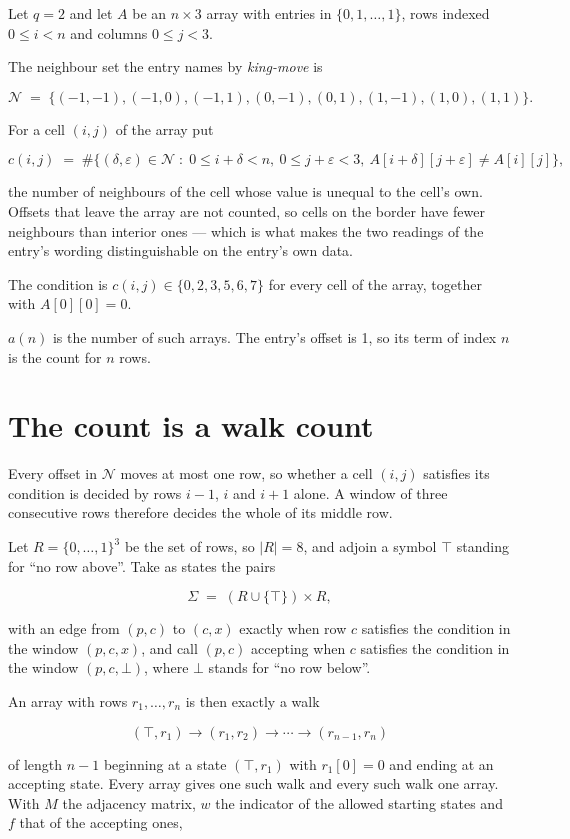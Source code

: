 \documentclass[11pt]{article}
\theoremstyle{definition}
\begin{document}
Let $q = 2$ and let $A$ be an $n \times 3$ array with entries in $\{0,1,\dots,1\}$, rows indexed $0 \le i < n$ and columns $0 \le j < 3$.

The neighbour set the entry names by {\itshape king-move} is

\[\mathcal{N} \;=\; \{(-1,-1), (-1,0), (-1,1), (0,-1), (0,1), (1,-1), (1,0), (1,1)\}.\]

For a cell $(i,j)$ of the array put

\[c(i,j) \;=\; \#\bigl\{(\delta,\varepsilon)\in\mathcal{N} \;:\; 0\le i+\delta<n,\ 0\le j+\varepsilon<3,\ A[i+\delta][j+\varepsilon] \neq A[i][j]\bigr\},\]

the number of neighbours of the cell whose value is unequal to the cell's own. Offsets that leave the array are not counted, so cells on the border have fewer neighbours than interior ones --- which is what makes the two readings of the entry's wording distinguishable on the entry's own data.

The condition is $c(i,j) \in \{0, 2, 3, 5, 6, 7\}$ for every cell of the array, together with $A[0][0]=0$.

$a(n)$ is the number of such arrays. The entry's offset is 1, so its term of index $n$ is the count for $n$ rows.

\section{The count is a walk count}

Every offset in $\mathcal{N}$ moves at most one row, so whether a cell $(i,j)$ satisfies its condition is decided by rows $i-1$, $i$ and $i+1$ alone. A window of three consecutive rows therefore decides the whole of its middle row.

Let $R = \{0,\dots,1\}^{3}$ be the set of rows, so $|R| = 8$, and adjoin a symbol $\top$ standing for ``no row above''. Take as states the pairs

\[\Sigma \;=\; (R \cup \{\top\}) \times R,\]

with an edge from $(p,c)$ to $(c,x)$ exactly when row $c$ satisfies the condition in the window $(p,c,x)$, and call $(p,c)$ accepting when $c$ satisfies the condition in the window $(p,c,\bot)$, where $\bot$ stands for ``no row below''.

An array with rows $r_1,\dots,r_n$ is then exactly a walk

\[(\top,r_1) \to (r_1,r_2) \to \cdots \to (r_{n-1},r_n)\]

of length $n-1$ beginning at a state $(\top,r_1)$ with $r_1[0]=0$ and ending at an accepting state. Every array gives one such walk and every such walk one array. With $M$ the adjacency matrix, $w$ the indicator of the allowed starting states and $f$ that of the accepting ones,
\end{document}
